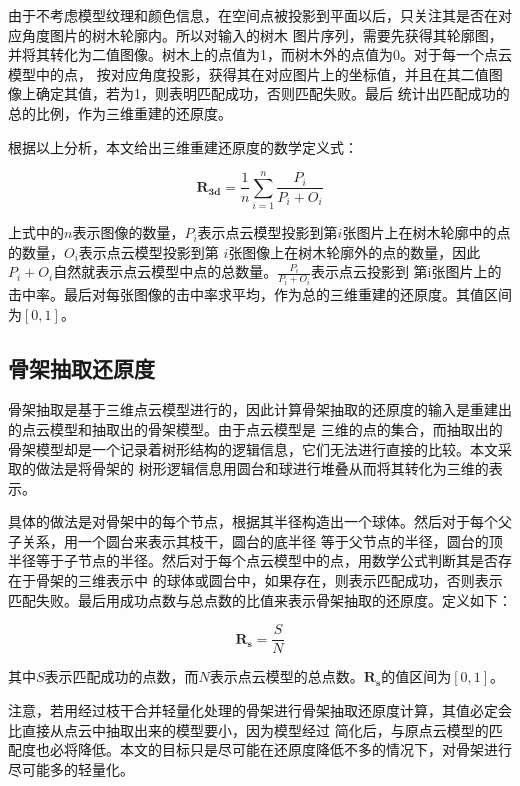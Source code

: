 由于不考虑模型纹理和颜色信息，在空间点被投影到平面以后，只关注其是否在对应角度图片的树木轮廓内。所以对输入的树木
图片序列，需要先获得其轮廓图，并将其转化为二值图像。树木上的点值为1，而树木外的点值为0。对于每一个点云模型中的点，
按对应角度投影，获得其在对应图片上的坐标值，并且在其二值图像上确定其值，若为1，则表明匹配成功，否则匹配失败。最后
统计出匹配成功的总的比例，作为三维重建的还原度。

根据以上分析，本文给出三维重建还原度的数学定义式：\\
\begin{definition}
	\[ \mathbf{R_{3d}}=\frac{1}{n}\sum_{i=1}^n \frac{P_i}{P_i+O_i}\]
\end{definition}

上式中的$n$表示图像的数量，$P_i$表示点云模型投影到第$i$张图片上在树木轮廓中的点的数量，$O_i$表示点云模型投影到第
$i$张图像上在树木轮廓外的点的数量，因此$P_i+O_i$自然就表示点云模型中点的总数量。$\frac{P_i}{P_i+O_i}$表示点云投影到
第i张图片上的击中率。最后对每张图像的击中率求平均，作为总的三维重建的还原度。其值区间为$[0,1]$。

\subsection{骨架抽取还原度}
骨架抽取是基于三维点云模型进行的，因此计算骨架抽取的还原度的输入是重建出的点云模型和抽取出的骨架模型。由于点云模型是
三维的点的集合，而抽取出的骨架模型却是一个记录着树形结构的逻辑信息，它们无法进行直接的比较。本文采取的做法是将骨架的
树形逻辑信息用圆台和球进行堆叠从而将其转化为三维的表示。

具体的做法是对骨架中的每个节点，根据其半径构造出一个球体。然后对于每个父子关系，用一个圆台来表示其枝干，圆台的底半径
等于父节点的半径，圆台的顶半径等于子节点的半径。然后对于每个点云模型中的点，用数学公式判断其是否存在于骨架的三维表示中
的球体或圆台中，如果存在，则表示匹配成功，否则表示匹配失败。最后用成功点数与总点数的比值来表示骨架抽取的还原度。定义如下：\\
\begin{definition}
	\[ \mathbf{R_s}=\frac{S}{N} \]
\end{definition}

其中$S$表示匹配成功的点数，而$N$表示点云模型的总点数。$\mathbf{R_s}$的值区间为$[0,1]$。

注意，若用经过枝干合并轻量化处理的骨架进行骨架抽取还原度计算，其值必定会比直接从点云中抽取出来的模型要小，因为模型经过
简化后，与原点云模型的匹配度也必将降低。本文的目标只是尽可能在还原度降低不多的情况下，对骨架进行尽可能多的轻量化。

